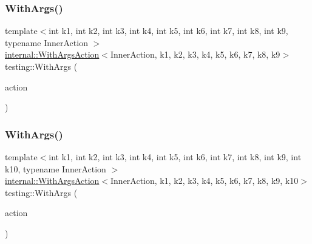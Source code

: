\mbox{\label{namespacetesting_a6aec78e6c201b150c78271e3f851414e}} 
\subsubsection{\texorpdfstring{WithArgs()}{WithArgs()}\hspace{0.1cm}{\footnotesize\ttfamily [9/11]}}
{\footnotesize\ttfamily template$<$int k1, int k2, int k3, int k4, int k5, int k6, int k7, int k8, int k9, typename Inner\+Action $>$ \\
\mbox{\hyperlink{structtesting_1_1internal_1_1_with_args_action}{internal\+::\+With\+Args\+Action}}$<$Inner\+Action, k1, k2, k3, k4, k5, k6, k7, k8, k9$>$ testing\+::\+With\+Args (\begin{DoxyParamCaption}\item[{const Inner\+Action \&}]{action }\end{DoxyParamCaption})\hspace{0.3cm}{\ttfamily [inline]}}

\mbox{\label{namespacetesting_a768a620ad07c6b5822201fa4f15fb4f0}} 
\subsubsection{\texorpdfstring{WithArgs()}{WithArgs()}\hspace{0.1cm}{\footnotesize\ttfamily [10/11]}}
{\footnotesize\ttfamily template$<$int k1, int k2, int k3, int k4, int k5, int k6, int k7, int k8, int k9, int k10, typename Inner\+Action $>$ \\
\mbox{\hyperlink{structtesting_1_1internal_1_1_with_args_action}{internal\+::\+With\+Args\+Action}}$<$Inner\+Action, k1, k2, k3, k4, k5, k6, k7, k8, k9, k10$>$ testing\+::\+With\+Args (\begin{DoxyParamCaption}\item[{const Inner\+Action \&}]{action }\end{DoxyParamCaption})\hspace{0.3cm}{\ttfamily [inline]}}

\mbox{\label{namespacetesting_a4b8dc8233e7b92226ffe51e0d0040604}} 
